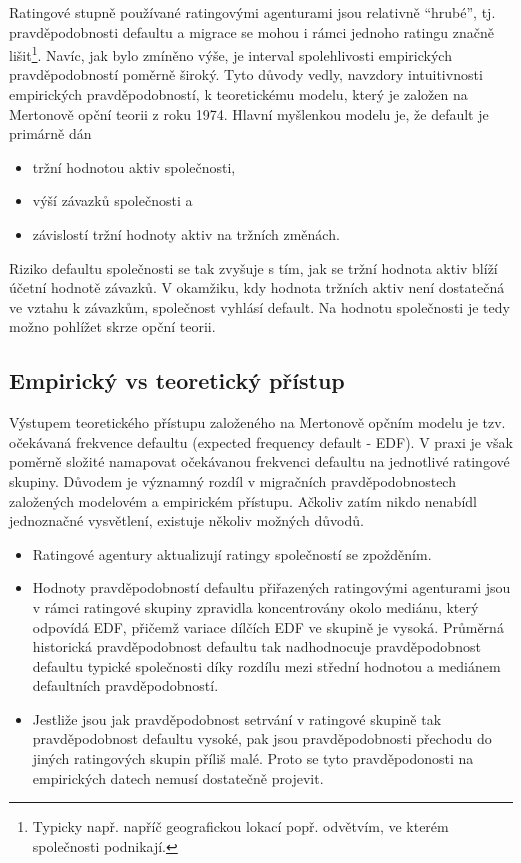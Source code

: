 Ratingové stupně používané ratingovými agenturami jsou relativně ``hrubé'', tj. pravděpodobnosti defaultu a migrace se mohou i rámci jednoho ratingu značně lišit\footnote{Typicky např. napříč geografickou lokací popř. odvětvím, ve kterém společnosti podnikají.}. Navíc, jak bylo zmíněno výše, je interval spolehlivosti empirických pravděpodobností poměrně široký. Tyto důvody vedly, navzdory intuitivnosti empirických pravděpodobností, k teoretickému modelu, který je založen na Mertonově opční teorii z roku 1974. Hlavní myšlenkou modelu je, že default je primárně dán
\begin{itemize}
\item tržní hodnotou aktiv společnosti,
\item výší závazků společnosti a
\item závislostí tržní hodnoty aktiv na tržních změnách.
\end{itemize}
Riziko defaultu společnosti se tak zvyšuje s tím, jak se tržní hodnota aktiv blíží účetní hodnotě závazků. V okamžiku, kdy hodnota tržních aktiv není dostatečná ve vztahu k závazkům, společnost vyhlásí default. Na hodnotu společnosti je tedy možno pohlížet skrze opční teorii.

\subsection{Empirický vs teoretický přístup}

Výstupem teoretického přístupu založeného na Mertonově opčním modelu je tzv. očekávaná frekvence defaultu (expected frequency default - EDF). V praxi je však poměrně složité namapovat očekávanou frekvenci defaultu na jednotlivé ratingové skupiny. Důvodem je významný rozdíl v migračních pravděpodobnostech založených modelovém a empirickém přístupu. Ačkoliv zatím nikdo nenabídl jednoznačné vysvětlení, existuje několiv možných důvodů.
\begin{itemize}
\item Ratingové agentury aktualizují ratingy společností se zpožděním.
\item Hodnoty pravděpodobností defaultu přiřazených ratingovými agenturami jsou v rámci ratingové skupiny zpravidla koncentrovány okolo mediánu, který odpovídá EDF, přičemž variace dílčích EDF ve skupině je vysoká. Průměrná historická pravděpodobnost defaultu tak nadhodnocuje pravděpodobnost defaultu typické společnosti díky rozdílu mezi střední hodnotou a mediánem defaultních pravděpodobností.
\item Jestliže jsou jak pravděpodobnost setrvání v ratingové skupině tak pravděpodobnost defaultu vysoké, pak jsou pravděpodobnosti přechodu do jiných ratingových skupin příliš malé. Proto se tyto pravděpodonosti na empirických datech nemusí dostatečně projevit.
\end{itemize}

